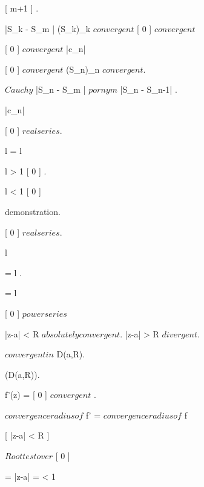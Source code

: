 \documentclass[../Main/main]{subfiles}
\begin{document}
{{{{				\leq {}[ m+1 ] .

				|S_k - S_m |  \imp (S_k)_k $ convergent $ \imp {}[ 0 ] $ convergent $
			}
		}
	}
	
	
	{
		{
			[ 0 ] $ convergent $
		}
		\holds
		{
			|c_n| 
		}
		\demonstration
		{
			[ 0 ] $ convergent $ \ifandonlyif (S_n)_n $ convergent $.

			\imp $ Cauchy $ |S_n - S_m |  $ por n y m $ \imp |S_n - S_{n-1}| .

			\imp |c_n| 
		}
	}
	
	
	{
		{
			[ 0 ] $ real series $.

			l \in \R \suchthat {} = l
		}
		\holds
		{
			l > 1 \imp {}[ 0 ] \nin \R.

			l < 1 \imp {}[ 0 ] \in \R
		}
		\demonstration
		{
			demonstration.
		}
	}
	
	
	{
		{
			[ 0 ] $ real series $.

			l \in \R \suchthat 
		}
		\holds
		{
			{
				 = l
			}.

			 = l
		}
	}
	
	
	
	
	
	{
		{
			[ 0 ] $ power series $
		}
		\holds
		{
			|z-a| < R \imp $ absolutely convergent $.
			|z-a| > R \imp $ divergent $.

			$ convergent in $ D(a,R).

			 \in \Hc(D(a,R)).

			{
				f'(z) = [ 0 ] $ convergent $ 
			}.

			$ convergence radius of $ f' = $ convergence radius of $ f
		}
		\demonstration
		{
			 [ |z-a| < R ]
			 {
			 	$ Root test over $ [ 0 ]

			 	 =
			 	|z-a|  =  < 1

}}}}
\end{document}
